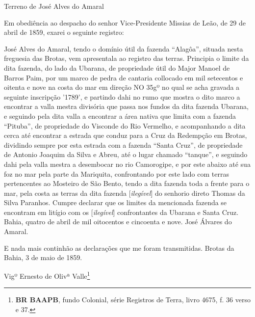 \begin{citacao}
Terreno de José Alves do Amaral

Em obediência ao despacho do senhor Vice-Presidente Missias de Leão, de 29 de abril de 1859, exarei o seguinte registro:

José Alves do Amaral, tendo o domínio útil da fazenda ``Alagôa'', situada nesta freguesia das Brotas, vem apresentala ao registro das terras. Principia o limite da dita fazenda, do lado da Ubarana, de propriedade útil do Major Manoel de Barros Paim, por um marco de pedra de cantaria collocado em mil setecentos e oitenta e nove na costa do mar em direção NO 35gº no qual se acha gravada a seguinte inscripção '1789', e partindo dahi no rumo que mostra o dito marco a encontrar a valla mestra divisória que passa nos fundos da dita fazenda Ubarana, e seguindo pela dita valla a encontrar a área nativa que limita com a fazenda ``Pituba'', de propriedade do Visconde do Rio Vermelho, e acompanhando a dita cerca até encontrar a estrada que conduz para a Cruz da Redempção em Brotas, dividindo sempre por esta estrada com a fazenda ``Santa Cruz'', de propriedade de Antonio Joaquim da Silva e Abreu, até o lugar chamado ``tanque'', e seguindo dahi pela valla mestra a desembocar no rio Camorogipe, e por este abaixo até sua foz no mar pela parte da Mariquita, confrontando por este lado com terras pertencentes ao Mosteiro de São Bento, tendo a dita fazenda toda a frente para o mar, pela costa as terras da dita fazenda [\textit{ilegível}] do senhorio direto Thomas da Silva Paranhos. Cumpre declarar que os limites da mencionada fazenda se encontram em litígio com os [\textit{ilegível}] confrontantes da Ubarana e Santa Cruz. Bahia, quatro de abril de mil oitocentos e cincoenta e nove. José Álvares do Amaral.

E nada mais continhão as declarações que me foram transmitidas. Brotas da Bahia, 3 de maio de 1859.

Vigº Ernesto de Olivª Valle\footnote{\textbf{BR BAAPB}, fundo Colonial, série Registros de Terra, livro 4675, f. 36 verso e 37.}
\end{citacao}


